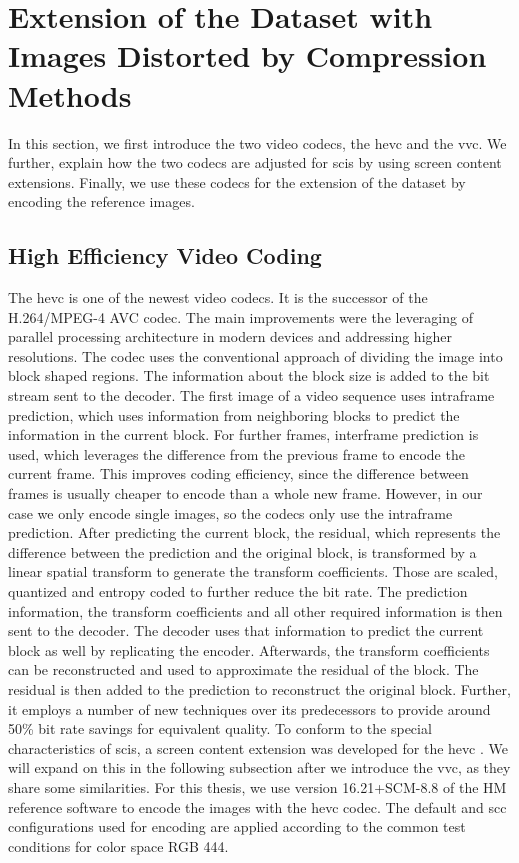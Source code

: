 \section{Extension of the Dataset with Images Distorted by Compression Methods}
\label{sec:dataset_codec}

In this section, we first introduce the two video codecs, the \gls{hevc} and the \gls{vvc}.
We further, explain how the two codecs are adjusted for \glspl{sci} by using screen content extensions.
Finally, we use these codecs for the extension of the dataset by encoding the reference images.

\subsection{High Efficiency Video Coding}
\label{subsec:hevc}

The \gls{hevc} \cite{hevc_2012} is one of the newest video codecs.
It is the successor of the H.264/MPEG-4 AVC codec.
The main improvements were the leveraging of parallel processing architecture in modern devices and addressing higher resolutions.
The codec uses the conventional approach of dividing the image into block shaped regions.
The information about the block size is added to the bit stream sent to the decoder.
The first image of a video sequence uses intraframe prediction, which uses information from neighboring blocks to predict the information in the current block.
For further frames, interframe prediction is used, which leverages the difference from the previous frame to encode the current frame.
This improves coding efficiency, since the difference between frames is usually cheaper to encode than a whole new frame.
However, in our case we only encode single images, so the codecs only use the intraframe prediction.
After predicting the current block, the residual, which represents the difference between the prediction and the original block, is transformed by a linear spatial transform to generate the transform coefficients.
Those are scaled, quantized and entropy coded to further reduce the bit rate.
The prediction information, the transform coefficients and all other required information is then sent to the decoder.
The decoder uses that information to predict the current block as well by replicating the encoder.
Afterwards, the transform coefficients can be reconstructed and used to approximate the residual of the block.
The residual is then added to the prediction to reconstruct the original block.
Further, it employs a number of new techniques over its predecessors to provide around 50\% bit rate savings for equivalent quality.
To conform to the special characteristics of \glspl{sci}, a screen content extension was developed for the \gls{hevc} \cite{hevc_scc_2015}.
We will expand on this in the following subsection after we introduce the \gls{vvc}, as they share some similarities.
For this thesis, we use version 16.21+SCM-8.8 of the HM reference software \cite{hevc_software_2020} to encode the images with the \gls{hevc} codec.
The default \cite{config_hevc_2013} and \gls{scc} \cite{config_hevc_scc_2015} configurations used for encoding are applied according to the common test conditions for color space RGB 444.

